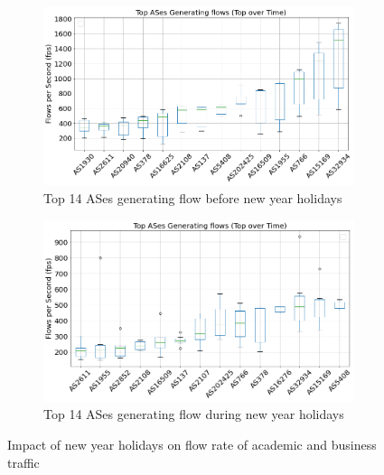 \documentclass[10pt, journal, letterpaper]{IEEEtran}
\newcommand\figSzeMahdi{0.8}
\begin{document}
\begin{figure}[hbt!]
    \centering
    \begin{subfigure}{\figSzeMahdi\columnwidth}
          \centering
          \includegraphics[width=\columnwidth]{img/BCH2_top14AS_generating_fps.png}
          \caption{Top 14 ASes generating flow before new year holidays}
          \label{fig:BCH2_topAS_gen_fps}
    \end{subfigure}
    \begin{subfigure}{\figSzeMahdi\columnwidth}
          \centering
          \includegraphics[width=\columnwidth]{img/CH2_top14AS_generating_fps.png}
          \caption{Top 14 ASes generating flow during new year holidays}
          \label{fig:CH2_topAS_gen_fps}
    \end{subfigure}
    \caption{Impact of new year holidays on flow rate of academic and business traffic}
    \label{fig:flowrate_topAS_gen_BCH_CH}
\end{figure}
\end{document}
